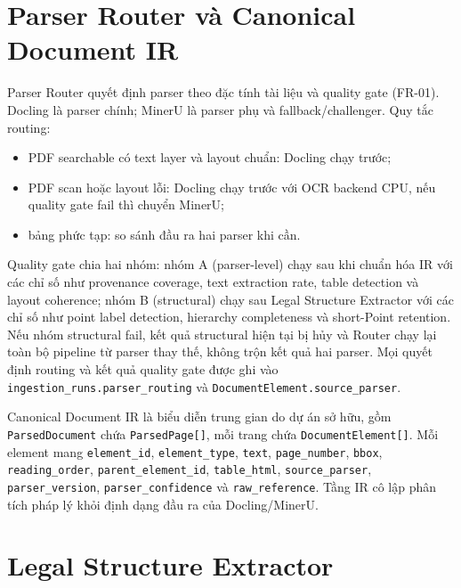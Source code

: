 \documentclass[a4paper,12pt]{extreport}
\newcommand{\code}[1]{\texttt{#1}}
\begin{document}
\section{Parser Router và Canonical Document IR}

Parser Router quyết định parser theo đặc tính tài liệu và quality gate (FR-01). Docling là parser chính; MinerU là parser phụ và fallback/challenger. Quy tắc routing:

\begin{itemize}
  \item PDF searchable có text layer và layout chuẩn: Docling chạy trước;
  \item PDF scan hoặc layout lỗi: Docling chạy trước với OCR backend CPU, nếu quality gate fail thì chuyển MinerU;
  \item bảng phức tạp: so sánh đầu ra hai parser khi cần.
\end{itemize}

\begin{sloppypar}
Quality gate chia hai nhóm: nhóm A (parser-level) chạy sau khi chuẩn hóa IR với các chỉ số như provenance coverage, text extraction rate, table detection và layout coherence; nhóm B (structural) chạy sau Legal Structure Extractor với các chỉ số như point label detection, hierarchy completeness và short-Point retention. Nếu nhóm structural fail, kết quả structural hiện tại bị hủy và Router chạy lại toàn bộ pipeline từ parser thay thế, không trộn kết quả hai parser. Mọi quyết định routing và kết quả quality gate được ghi vào \code{ingestion\_runs\allowbreak.parser\_routing} và \code{DocumentElement\allowbreak.source\_parser}.
\end{sloppypar}

\begin{sloppypar}
Canonical Document IR là biểu diễn trung gian do dự án sở hữu, gồm \code{ParsedDocument} chứa \code{ParsedPage[]}, mỗi trang chứa \code{DocumentElement[]}. Mỗi element mang \code{element\_id}, \code{element\_type}, \code{text}, \code{page\_number}, \code{bbox}, \code{reading\_order}, \code{parent\_element\_id}, \code{table\_html}, \code{source\_parser}, \code{parser\_version}, \code{parser\_confidence} và \code{raw\_reference}. Tầng IR cô lập phân tích pháp lý khỏi định dạng đầu ra của Docling/MinerU.
\end{sloppypar}

\section{Legal Structure Extractor}
\end{document}
